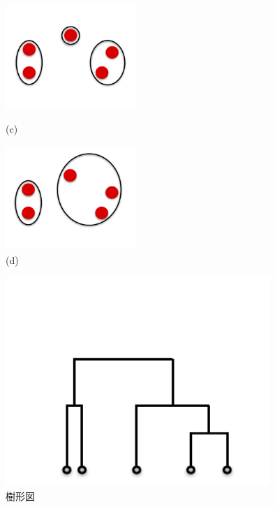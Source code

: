 \documentclass[titlepage,12pt]{jreport}
\begin{document}
\begin{figure}[htbp]
	\begin{minipage}{0.50\hsize}
		\begin{center}
			\includegraphics[width = 50mm,bb = 0 0 261 205]{img/gyou3.png}
		\end{center}
		\caption{(c)}
		\label{fig:g3}
	\end{minipage}
	\begin{minipage}{0.50\hsize}
		\begin{center}
			\includegraphics[width = 50mm,bb = 0 0 324 257]{img/gyou4.png}
		\end{center}
		\caption{(d)}
		\label{fig:g4}
	\end{minipage}
\end{figure}
\begin{figure}[htbp]
\centering
\includegraphics[width = 100mm,bb = 0 0 324 257]{img/ju1.png}
\caption{樹形図}
\label{fig:j1}
\end{figure}
\end{document}
